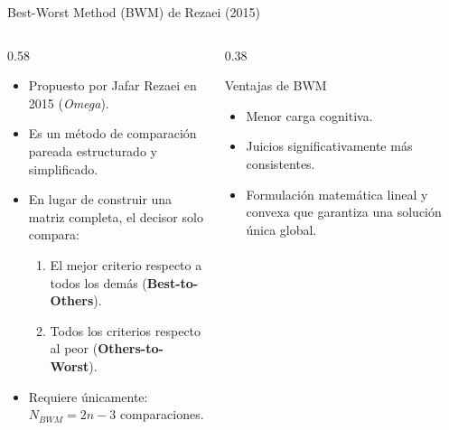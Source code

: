 \documentclass[aspectratio=169, 10pt]{beamer}
\begin{document}
\begin{frame}{Best-Worst Method (BWM) de Rezaei (2015)}
    \begin{columns}[T]
        \begin{column}{0.58\textwidth}
            \begin{itemize}
                \item Propuesto por Jafar Rezaei en 2015 (\textit{Omega}).
                \item Es un método de comparación pareada estructurado y simplificado.
                \item En lugar de construir una matriz completa, el decisor solo compara:
                      \begin{enumerate}
                          \item El mejor criterio respecto a todos los demás (\textbf{Best-to-Others}).
                          \item Todos los criterios respecto al peor (\textbf{Others-to-Worst}).
                      \end{enumerate}
                \item Requiere únicamente: $N_{BWM} = 2n - 3$ comparaciones.
            \end{itemize}
        \end{column}
        \begin{column}{0.38\textwidth}
            \begin{exampleblock}{Ventajas de BWM}
                \scriptsize
                \begin{itemize}
                    \item Menor carga cognitiva.
                    \item Juicios significativamente más consistentes.
                    \item Formulación matemática lineal y convexa que garantiza una solución única global.
                \end{itemize}
            \end{exampleblock}
        \end{column}
    \end{columns}
\end{frame}
\end{document}
